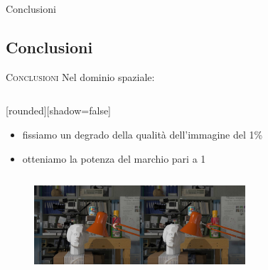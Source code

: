 \documentclass{beamer}
\begin{document}
\begin{section}{Conclusioni}
\subsection{Conclusioni}


\begin{frame}[t]{\textsc{Conclusioni}}
Nel dominio spaziale:
\begin{columns}
\begin{column}{5cm}
[rounded][shadow=false]
\begin{block}{}
\begin{itemize}
\item fissiamo un degrado della qualit\`{a} dell'immagine del 1\%
\item otteniamo la potenza del marchio pari a 1
\end{itemize}
\end{block}
\end{column}

\begin{column}{5cm}
\vspace{-6mm}
\begin{table}
\end{table}

\end{column}
\end{columns}
\vspace{2mm}
\begin{figure}
  \includegraphics[width=0.7\textwidth]{./img_wat/marked_1_gauss.jpg}  
  \caption{} 
  \label{fig:mg1}
\end{figure}
\end{frame}



\end{section}
\end{document}
